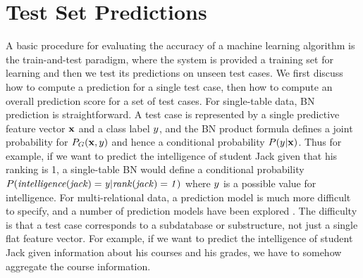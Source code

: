 \documentclass{acm_proc_article-sp}
\begin{document}
\section{Test Set Predictions}

A basic procedure for evaluating the accuracy of a machine learning algorithm is the train-and-test paradigm, where the system is provided a training set for learning and then we test its predictions on unseen test cases. %
%
We first discuss how to compute a prediction for a single test case, then how to compute an overall prediction score for a set of test cases. For single-table data, BN prediction is straightforward. A test case is represented by a single predictive feature vector $\mathbf{x}$ and a class label $y$, and the BN product formula defines a joint probability for $P_{G}(\mathbf{x},y)$ and hence a conditional probability $P(y|\mathbf{x})$. Thus for example, if we want to predict the intelligence of student Jack given that his ranking is 1, a single-table BN would define a conditional probability $P(\it{intelligence}(jack) = y|\it{rank}(jack)=1)$ where $y$ is a possible value for intelligence.
For multi-relational data, a prediction model is much more difficult to specify, and 
a number of prediction models have been explored \cite{Dzeroski2001c}. The difficulty is that a test case corresponds to a subdatabase or substructure, not just a single flat feature vector. For example, if we want to predict the intelligence of student Jack given information about his courses and his grades, we have to somehow aggregate the course information. 
\end{document}
